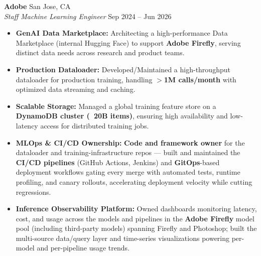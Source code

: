\documentclass[10pt,letterpaper]{article}
\begin{document}
\textbf{Adobe} \hfill San Jose, CA \\
\textit{Staff Machine Learning Engineer} \hfill Sep 2024 -- Jun 2026
\begin{itemize}
    \item \textbf{GenAI Data Marketplace:} Architecting a high-performance Data Marketplace (internal Hugging Face) to support \textbf{Adobe Firefly}, serving distinct data needs across research and product teams.
    \item \textbf{Production Dataloader:} Developed/Maintained a high-throughput dataloader for production training, handling \textbf{$>$1M calls/month} with optimized data streaming and caching.
    \item \textbf{Scalable Storage:} Managed a global training feature store on a \textbf{DynamoDB cluster (~20B items)}, ensuring high availability and low-latency access for distributed training jobs.
    \item \textbf{MLOps \& CI/CD Ownership:} \textbf{Code and framework owner} for the dataloader and training-infrastructure repos — built and maintained the \textbf{CI/CD pipelines} (GitHub Actions, Jenkins) and \textbf{GitOps}-based deployment workflows gating every merge with automated tests, runtime profiling, and canary rollouts, accelerating deployment velocity while cutting regressions.
    \item \textbf{Inference Observability Platform:} Owned dashboards monitoring latency, cost, and usage across the models and pipelines in the \textbf{Adobe Firefly} model pool (including third-party models) spanning Firefly and Photoshop; built the multi-source data/query layer and time-series visualizations powering per-model and per-pipeline usage trends.
\end{itemize}
\end{document}
